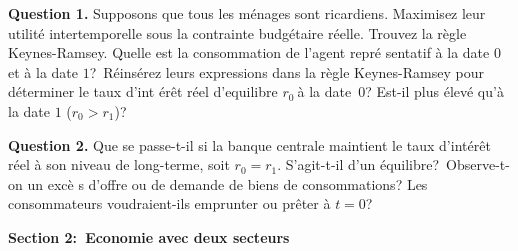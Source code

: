 \documentclass[11pt,a4paper]{article}
\begin{document}

\bigskip

\textbf{Question 1.} Supposons que tous les m\'{e}nages  sont ricardiens. Maximisez leur utilit\'{e} intertemporelle sous la contrainte budg\'{e}taire r\'{e}elle. Trouvez la r\`{e}gle Keynes-Ramsey. Quelle est la consommation de l'agent repr\'{e}%
sentatif \`{a} la date $0$ et \`{a} la date $1$?\ R\'{e}ins\'{e}rez leurs
expressions dans la r\`{e}gle Keynes-Ramsey   pour d\'{e}terminer le taux d'int%
\'{e}r\^{e}t r\'{e}el d'equilibre $r_{0}\ $\`{a} la date\ $0$? Est-il plus \'{e}lev\'{e}
qu'\`{a} la date $1$ ($r_{0}>r_{1}$)?


\bigskip

\textbf{Question 2. } Que se passe-t-il si la banque centrale
maintient le taux d'int\'{e}r\^{e}t r\'{e}el \`{a} son niveau de long-terme,
soit $r_{0}=r_{1}$. S'agit-t-il d'un \'{e}quilibre?\ Observe-t-on un exc\`{e}%
s d'offre ou de demande de biens de consommations? Les consommateurs voudraient-ils emprunter ou pr\^{e}ter \`{a} $ t = 0 $? 


\bigskip 

%


\bigskip


\textbf{Section 2:\ Economie avec deux secteurs}
\end{document}
